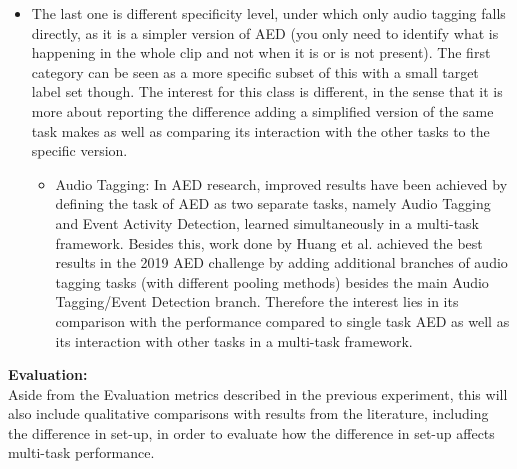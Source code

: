 \begin{itemize}
		\item The last one is different specificity level, under which only audio tagging falls directly, as it is a simpler version of AED (you only need to identify what is happening in the whole clip and not when it is or is not present). The first category can be seen as a more specific subset of this with a small target label set though. The interest for this class is different, in the sense that it is more about reporting the difference adding a simplified version of the same task makes as well as comparing its interaction with the other tasks to the specific version.
		\begin{itemize}
			\item Audio Tagging: In AED research, improved results have been achieved by defining the task of AED as two separate tasks, namely Audio Tagging and Event Activity Detection, learned simultaneously in a multi-task framework. Besides this, work done by Huang et al. achieved the best results in the 2019 AED challenge by adding additional branches of audio tagging tasks (with different pooling methods) besides the main Audio Tagging/Event Detection branch. Therefore the interest lies in its comparison with the performance compared to single task AED as well as its interaction with other tasks in a multi-task framework.
		\end{itemize}
	\end{itemize}
	



	
	
	\textbf{Evaluation:}\\
	
	Aside from the Evaluation metrics described in the previous experiment, this will also include qualitative comparisons with results from the literature, including the difference in set-up, in order to evaluate how the difference in set-up affects multi-task performance.

